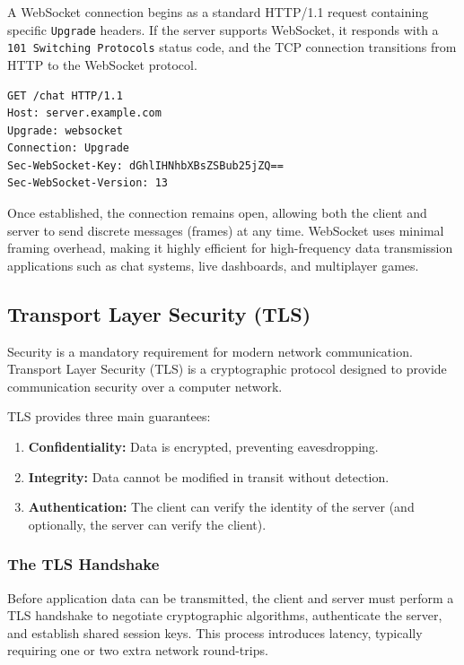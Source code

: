 A WebSocket connection begins as a standard HTTP/1.1 request containing specific \texttt{Upgrade} headers. If the server supports WebSocket, it responds with a \texttt{101 Switching Protocols} status code, and the TCP connection transitions from HTTP to the WebSocket protocol.

\begin{lstlisting}[basicstyle=\small\ttfamily, caption={WebSocket Handshake Request}]
GET /chat HTTP/1.1
Host: server.example.com
Upgrade: websocket
Connection: Upgrade
Sec-WebSocket-Key: dGhlIHNhbXBsZSBub25jZQ==
Sec-WebSocket-Version: 13
\end{lstlisting}

Once established, the connection remains open, allowing both the client and server to send discrete messages (frames) at any time. WebSocket uses minimal framing overhead, making it highly efficient for high-frequency data transmission applications such as chat systems, live dashboards, and multiplayer games.

\subsection{Transport Layer Security (TLS)}

Security is a mandatory requirement for modern network communication. Transport Layer Security (TLS) is a cryptographic protocol designed to provide communication security over a computer network.

TLS provides three main guarantees:
\begin{enumerate}
    \item \textbf{Confidentiality:} Data is encrypted, preventing eavesdropping.
    \item \textbf{Integrity:} Data cannot be modified in transit without detection.
    \item \textbf{Authentication:} The client can verify the identity of the server (and optionally, the server can verify the client).
\end{enumerate}

\subsubsection{The TLS Handshake}

Before application data can be transmitted, the client and server must perform a TLS handshake to negotiate cryptographic algorithms, authenticate the server, and establish shared session keys. This process introduces latency, typically requiring one or two extra network round-trips.


